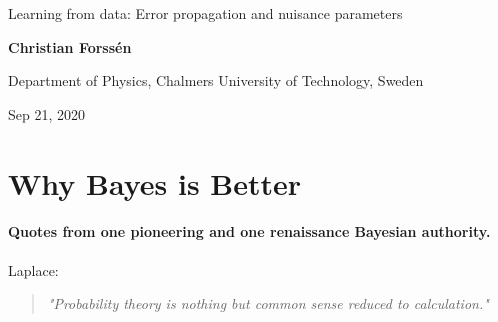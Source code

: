 \documentclass[%
oneside,                 %
final,                   %
10pt]{article}
\begin{document}

\newcommand{\exercisesection}[1]{\subsection*{#1}}







\thispagestyle{empty}

\begin{center}
{\LARGE\bf
\begin{spacing}{1.25}
Learning from data: Error propagation and nuisance parameters
\end{spacing}
}
\end{center}


\begin{center}
{\bf Christian Forssén}
\end{center}

    \begin{center}
\centerline{{\small Department of Physics, Chalmers University of Technology, Sweden}}
\end{center}
    

\begin{center}
Sep 21, 2020
\end{center}

\vspace{1cm}


\section{Why Bayes is Better}

\paragraph{Quotes from one pioneering and one renaissance Bayesian authority.}
Laplace:

\begin{quote}
\emph{"Probability theory is nothing but common sense reduced to calculation."}
\end{quote}
\end{document}
